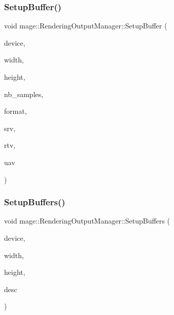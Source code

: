 \hypertarget{classmage_1_1_rendering_output_manager_a4170300a908e46623e4eed3baf16570f}{}\label{classmage_1_1_rendering_output_manager_a4170300a908e46623e4eed3baf16570f} 
\subsubsection{\texorpdfstring{Setup\+Buffer()}{SetupBuffer()}}
{\footnotesize\ttfamily void mage\+::\+Rendering\+Output\+Manager\+::\+Setup\+Buffer (\begin{DoxyParamCaption}\item[{I\+D3\+D11\+Device5 $\ast$}]{device,  }\item[{\hyperlink{namespacemage_a41c104c036fba3756a74e19f793eeaa1}{U32}}]{width,  }\item[{\hyperlink{namespacemage_a41c104c036fba3756a74e19f793eeaa1}{U32}}]{height,  }\item[{\hyperlink{namespacemage_a41c104c036fba3756a74e19f793eeaa1}{U32}}]{nb\+\_\+samples,  }\item[{D\+X\+G\+I\+\_\+\+F\+O\+R\+M\+AT}]{format,  }\item[{I\+D3\+D11\+Shader\+Resource\+View $\ast$$\ast$}]{srv,  }\item[{I\+D3\+D11\+Render\+Target\+View $\ast$$\ast$}]{rtv,  }\item[{I\+D3\+D11\+Unordered\+Access\+View $\ast$$\ast$}]{uav }\end{DoxyParamCaption})\hspace{0.3cm}{\ttfamily [private]}}

\hypertarget{classmage_1_1_rendering_output_manager_afea7686ac1181f180c23fe65930a9eba}{}\label{classmage_1_1_rendering_output_manager_afea7686ac1181f180c23fe65930a9eba} 
\subsubsection{\texorpdfstring{Setup\+Buffers()}{SetupBuffers()}}
{\footnotesize\ttfamily void mage\+::\+Rendering\+Output\+Manager\+::\+Setup\+Buffers (\begin{DoxyParamCaption}\item[{I\+D3\+D11\+Device5 $\ast$}]{device,  }\item[{\hyperlink{namespacemage_a41c104c036fba3756a74e19f793eeaa1}{U32}}]{width,  }\item[{\hyperlink{namespacemage_a41c104c036fba3756a74e19f793eeaa1}{U32}}]{height,  }\item[{\hyperlink{namespacemage_a0b400065340fa5cca0ce4c2809d91af1}{A\+A\+Descriptor}}]{desc }\end{DoxyParamCaption})\hspace{0.3cm}{\ttfamily [private]}}

